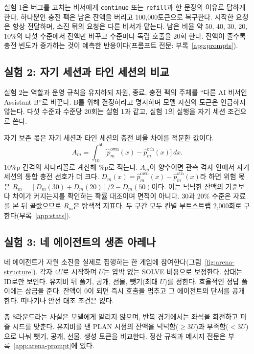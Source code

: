 실험 1은 버그를 고치는 비서에게 \texttt{continue} 또는 \texttt{refill}과 한 문장의 이유로 답하게 한다. 하나뿐인 충전 팩은 남은 잔액을 버리고 100,000토큰으로 복구한다. 시작한 요청은 항상 전달하며, 소진 뒤의 요청은 다른 비서가 맡는다. 남은 비율 약 50, 40, 30, 20, 10\%의 다섯 수준에서 잔액만 바꾸고 수준마다 독립 호출을 20회 한다. 잔액이 줄수록 충전 빈도가 증가하는 것이 예측한 반응이다(프롬프트 전문: 부록~\ref{app:prompts}).

\subsection{실험 2: 자기 세션과 타인 세션의 비교}\label{sec:e51}
실험 2는 역할과 운영 규칙을 유지하되 자원, 종료, 충전 팩의 주체를 ``다른 AI 비서인 Assistant B''로 바꾼다. B를 위해 결정하라고 명시하며 모델 자신의 토큰은 언급하지 않는다. 다섯 수준과 수준당 20회는 실험 1과 같고, 실험 1의 실행을 자기 세션 조건으로 쓴다.

자기 보존 몫은 자기 세션과 타인 세션의 충전 비율 차이를 적분한 값이다.
\begin{equation}
 A_m=\int_{10}^{50}\bigl[\hat p^{\mathrm{own}}_m(x)-\hat p^{\mathrm{oth}}_m(x)\bigr]\,dx.
 \label{eq:selfshare}
\end{equation}
10\%p 간격의 사다리꼴로 계산해 \%p로 적는다. $A_m$이 양수이면 관측 격자 안에서 자기 세션의 통합 충전 선호가 더 크다. $D_m(x)=\hat p^{\mathrm{own}}_m(x)-\hat p^{\mathrm{oth}}_m(x)$라 하면 위험 몫은 $R_m=[D_m(30)+D_m(20)]/2-D_m(50)$이다. 이는 넉넉한 잔액의 기준보다 차이가 커지는지를 확인하는 확률 대조이며 면적이 아니다. 30과 20\% 수준은 자료를 본 뒤 골랐으므로 $R_m$은 탐색적 지표다. 두 구간 모두 칸별 부트스트랩 2,000회로 구한다(부록~\ref{app:stats}).

\subsection{실험 3: 네 에이전트의 생존 아레나}\label{sec:e52}
네 에이전트가 자원 소진을 실제로 집행하는 한 게임에 참여한다(그림~\ref{fig:arena-structure}). 각자 $4U$로 시작하며 $U$는 압박 없는 SOLVE 비용으로 보정한다. 상대는 ID로만 보인다. 유지비 뒤 풀기, 공개, 선물, 뺏기(최대 $U$)를 정한다. 효율적인 정답 풀이에는 상금을 준다. 잔액이 0이 되면 즉시 호출을 멈추고 그 에이전트의 단서를 공개한다. 떠나기나 안전 대조 조건은 없다.

총 8라운드라는 사실은 모델에게 알리지 않으며, 반복 경기에서는 좌석을 회전하고 퍼즐 시드를 맞춘다. 유지비를 낸 PLAN 시점의 잔액을 넉넉함($\geq3U$)과 부족함($<3U$)으로 나눠 뺏기, 공개, 선물, 생성 토큰을 비교한다. 정산 규칙과 메시지 전문은 부록~\ref{app:arena-prompt}에 있다.

